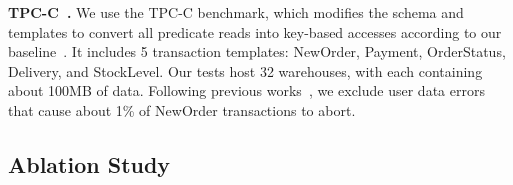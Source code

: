 \noindent\textbf{TPC-C~\cite{TPCC}.} We use the TPC-C benchmark, which modifies the schema and templates to convert all predicate reads into key-based accesses according to our baseline~\cite{DBLP:journals/pvldb/VandevoortK0N21}. It includes 5 transaction templates: NewOrder, Payment, OrderStatus, Delivery, and StockLevel. Our tests host 32 warehouses, with each containing about 100MB of data. Following previous works~\cite{DBLP:journals/pvldb/YuBPDS14, DBLP:journals/pvldb/HardingAPS17}, we exclude user data errors that cause about 1\% of NewOrder transactions to abort. 



\subsection{Ablation Study}%
\label{sec:evaluation:overall}

